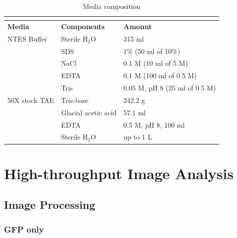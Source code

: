 \pagebreak

\begin{longtabu} to \textwidth {X[1.2,c]X[1.2,l]X[2,l]}
  \caption{Media composition}\\
  \label{table:E-1}\\
  \toprule
    \textbf{Media} & \textbf{Components} & \textbf{Amount}\\
    \midrule
    \endhead
    NTES Buffer & Sterile H$_2$O & 315 ml\\
    & SDS & 1\% (50 ml of 10\%)\\
    & NaCl & 0.1 M (10 ml of 5 M)\\
    & EDTA & 0.1 M (100 ml of 0.5 M)\\
    & Tris & 0.05 M, pH 8 (25 ml of 0.5 M)\\
    \midrule
    50X stock TAE & Tris-base & 242.2 g\\
    & Glacial acetic acid & 57.1 ml\\
    & EDTA & 0.5 M, pH 8, 100 ml\\
    & Sterile H$_2$O & up to 1 L\\
    \bottomrule
\end{longtabu}

\pagebreak

\section{High-throughput Image Analysis}

\subsection{Image Processing}

\subsubsection*{GFP only}

